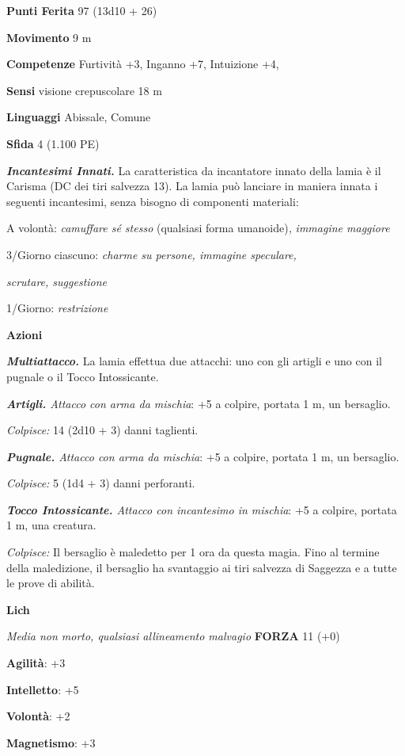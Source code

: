 \begin{multicols}{2}
\textbf{Punti Ferita} 97 (13d10 + 26)

\textbf{Movimento} 9 m

\textbf{Competenze} Furtività +3, Inganno +7, Intuizione +4,

\textbf{Sensi} visione crepuscolare 18 m

\textbf{Linguaggi} Abissale, Comune

\textbf{Sfida} 4 (1.100 PE)\smallskip

\emph{\textbf{Incantesimi Innati.}} La caratteristica da incantatore
innato della lamia è il Carisma (DC dei tiri salvezza 13). La lamia può
lanciare in maniera innata i seguenti incantesimi, senza bisogno di
componenti materiali:

A volontà: \emph{camuffare sé stesso} (qualsiasi forma umanoide)\emph{,}
\emph{immagine maggiore}

3/Giorno ciascuno: \emph{charme su persone, immagine speculare,}

\emph{scrutare, suggestione}

1/Giorno: \emph{restrizione}

\smallskip\textbf{Azioni}

\emph{\textbf{Multiattacco.}} La lamia effettua due attacchi: uno con
gli artigli e uno con il pugnale o il Tocco Intossicante.

\emph{\textbf{Artigli.} Attacco con arma da mischia}: +5 a colpire,
portata 1 m, un bersaglio.

\emph{Colpisce:} 14 (2d10 + 3) danni taglienti.

\emph{\textbf{Pugnale.} Attacco con arma da mischia}: +5 a colpire,
portata 1 m, un bersaglio.

\emph{Colpisce:} 5 (1d4 + 3) danni perforanti.

\emph{\textbf{Tocco Intossicante.} Attacco con incantesimo in mischia}:
+5 a colpire, portata 1 m, una creatura.

\emph{Colpisce:} Il bersaglio è maledetto per 1 ora da questa magia.
Fino al termine della maledizione, il bersaglio ha svantaggio ai tiri
salvezza di Saggezza e a tutte le prove di abilità.

\textbf{Lich}

\emph{Media non morto, qualsiasi allineamento malvagio} \textbf{FORZA}
11 (+0)

\textbf{Agilità}: +3

\textbf{Intelletto}: +5

\textbf{Volontà}: +2

\textbf{Magnetismo}: +3


\end{multicols}
